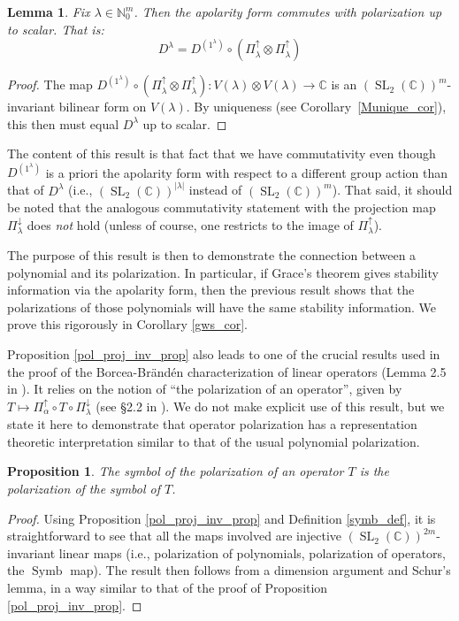 \documentclass{article}
\newtheorem{lemma}[theorem]{Lemma}
\newtheorem{proposition}[theorem]{Proposition}
\theoremstyle{definition}
\theoremstyle{plain}
\newcommand{\C}{\mathbb{C}}
\newcommand{\N}{\mathbb{N}}
\DeclareMathOperator{\Symb}{Symb}
\DeclareMathOperator{\SL}{SL}
\begin{document}
\begin{lemma}\label{form_pol_commute_lemma}
    Fix $\lambda \in \N_0^m$. Then the apolarity form commutes with polarization up to scalar. That is:
    \[
        D^\lambda = D^{(1^\lambda)} \circ (\Pi_\lambda^\uparrow \otimes \Pi_\lambda^\uparrow)
    \]
\end{lemma}
\begin{proof}
    The map $D^{(1^\lambda)} \circ (\Pi_\lambda^\uparrow \otimes \Pi_\lambda^\uparrow): V(\lambda) \otimes V(\lambda) \rightarrow \C$ is an $(\SL_2(\C))^m$-invariant bilinear form on $V(\lambda)$. By uniqueness (see Corollary~\ref{Munique_cor}), this then must equal $D^\lambda$ up to scalar.
\end{proof}

The content of this result is that fact that we have commutativity even though $D^{(1^\lambda)}$ is a priori the apolarity form with respect to a different group action than that of $D^\lambda$ (i.e., $(\SL_2(\C))^{|\lambda|}$ instead of $(\SL_2(\C))^m$). That said, it should be noted that the analogous commutativity statement with the projection map $\Pi_\lambda^\downarrow$ does \emph{not} hold (unless of course, one restricts to the image of $\Pi_\lambda^\uparrow$).

The purpose of this result is then to demonstrate the connection between a polynomial and its polarization. In particular, if Grace's theorem gives stability information via the apolarity form, then the previous result shows that the polarizations of those polynomials will have the same stability information. We prove this rigorously in Corollary \ref{gws_cor}.

Proposition \ref{pol_proj_inv_prop} also leads to one of the crucial results used in the proof of the Borcea-Br{\"a}nd{\'e}n characterization of linear operators (Lemma 2.5 in \cite{bb1}). It relies on the notion of ``the polarization of an operator'', given by $T \mapsto \Pi_\alpha^\uparrow \circ T \circ \Pi_\lambda^\downarrow$ (see \S2.2 in \cite{bb1}). We do not make explicit use of this result, but we state it here to demonstrate that operator polarization has a representation theoretic interpretation similar to that of the usual polynomial polarization.

\begin{proposition}
    The symbol of the polarization of an operator $T$ is the polarization of the symbol of $T$.
\end{proposition}
\begin{proof}
    Using Proposition \ref{pol_proj_inv_prop} and Definition \ref{symb_def}, it is straightforward to see that all the maps involved are injective $(\SL_2(\C))^{2m}$-invariant linear maps (i.e., polarization of polynomials, polarization of operators, the $\Symb$ map). The result then follows from a dimension argument and Schur's lemma, in a way similar to that of the proof of Proposition \ref{pol_proj_inv_prop}.
\end{proof}
    
\end{document}

